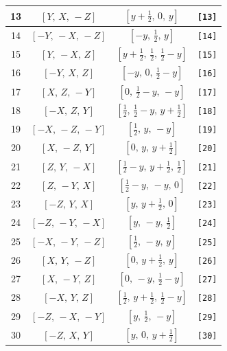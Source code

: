\documentclass[fleqn,8pt]{jsarticle}
\begin{document}
\begin{longtable}{cccc}
13 & $\left[ Y,\, X,\, - Z \right]$ & $\left[ y + \frac{1}{2},\, 0,\, y \right]$ & {\tt [13]} \\ \hline
14 & $\left[ - Y,\, - X,\, - Z \right]$ & $\left[ - y,\, \frac{1}{2},\, y \right]$ & {\tt [14]} \\ \hline
15 & $\left[ Y,\, - X,\, Z \right]$ & $\left[ y + \frac{1}{2},\, \frac{1}{2},\, \frac{1}{2} - y \right]$ & {\tt [15]} \\ \hline
16 & $\left[ - Y,\, X,\, Z \right]$ & $\left[ - y,\, 0,\, \frac{1}{2} - y \right]$ & {\tt [16]} \\ \hline
17 & $\left[ X,\, Z,\, - Y \right]$ & $\left[ 0,\, \frac{1}{2} - y,\, - y \right]$ & {\tt [17]} \\ \hline
18 & $\left[ - X,\, Z,\, Y \right]$ & $\left[ \frac{1}{2},\, \frac{1}{2} - y,\, y + \frac{1}{2} \right]$ & {\tt [18]} \\ \hline
19 & $\left[ - X,\, - Z,\, - Y \right]$ & $\left[ \frac{1}{2},\, y,\, - y \right]$ & {\tt [19]} \\ \hline
20 & $\left[ X,\, - Z,\, Y \right]$ & $\left[ 0,\, y,\, y + \frac{1}{2} \right]$ & {\tt [20]} \\ \hline
21 & $\left[ Z,\, Y,\, - X \right]$ & $\left[ \frac{1}{2} - y,\, y + \frac{1}{2},\, \frac{1}{2} \right]$ & {\tt [21]} \\ \hline
22 & $\left[ Z,\, - Y,\, X \right]$ & $\left[ \frac{1}{2} - y,\, - y,\, 0 \right]$ & {\tt [22]} \\ \hline
23 & $\left[ - Z,\, Y,\, X \right]$ & $\left[ y,\, y + \frac{1}{2},\, 0 \right]$ & {\tt [23]} \\ \hline
24 & $\left[ - Z,\, - Y,\, - X \right]$ & $\left[ y,\, - y,\, \frac{1}{2} \right]$ & {\tt [24]} \\ \hline
25 & $\left[ - X,\, - Y,\, - Z \right]$ & $\left[ \frac{1}{2},\, - y,\, y \right]$ & {\tt [25]} \\ \hline
26 & $\left[ X,\, Y,\, - Z \right]$ & $\left[ 0,\, y + \frac{1}{2},\, y \right]$ & {\tt [26]} \\ \hline
27 & $\left[ X,\, - Y,\, Z \right]$ & $\left[ 0,\, - y,\, \frac{1}{2} - y \right]$ & {\tt [27]} \\ \hline
28 & $\left[ - X,\, Y,\, Z \right]$ & $\left[ \frac{1}{2},\, y + \frac{1}{2},\, \frac{1}{2} - y \right]$ & {\tt [28]} \\ \hline
29 & $\left[ - Z,\, - X,\, - Y \right]$ & $\left[ y,\, \frac{1}{2},\, - y \right]$ & {\tt [29]} \\ \hline
30 & $\left[ - Z,\, X,\, Y \right]$ & $\left[ y,\, 0,\, y + \frac{1}{2} \right]$ & {\tt [30]} \\ \hline

\end{longtable}
\end{document}
